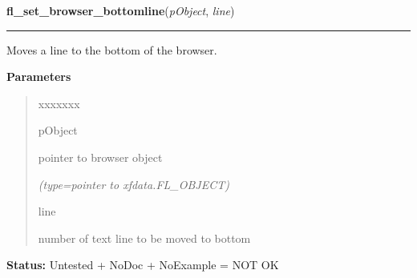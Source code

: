 \hspace{.8\funcindent}\begin{boxedminipage}{\funcwidth}

    \raggedright \textbf{fl\_set\_browser\_bottomline}(\textit{pObject}, \textit{line})

    \vspace{-1.5ex}

    \rule{\textwidth}{0.5\fboxrule}
\setlength{\parskip}{2ex}
    Moves a line to the bottom of the browser.

\setlength{\parskip}{1ex}
      \textbf{Parameters}
      \vspace{-1ex}

      \begin{quote}
        \begin{Ventry}{xxxxxxx}

          \item[pObject]

          pointer to browser object

            {\it (type=pointer to xfdata.FL\_OBJECT)}

          \item[line]

          number of text line to be moved to bottom

        \end{Ventry}

      \end{quote}

\textbf{Status:} Untested + NoDoc + NoExample = NOT OK



    \end{boxedminipage}

    \label{xformslib:library:fl_set_browser_fontsize}

    \vspace{0.5ex}

